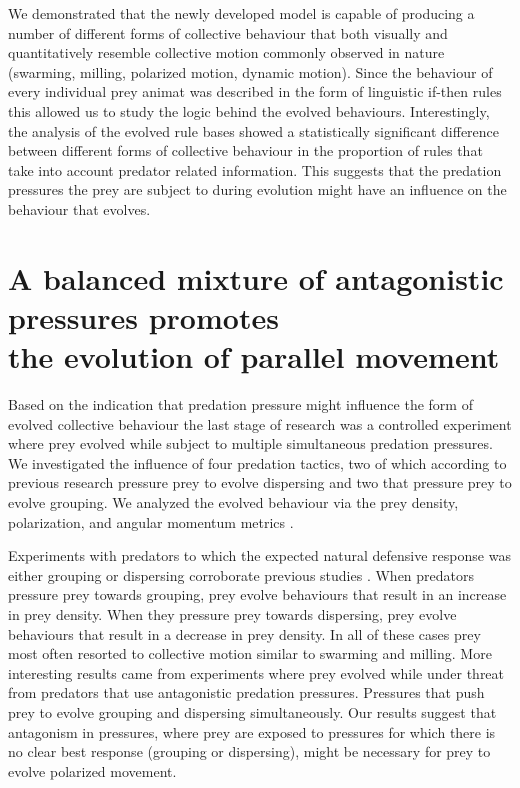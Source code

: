 We demonstrated that the newly developed model is capable of producing a number of different forms of collective behaviour that both visually and quantitatively \cite{couzin2002collective,vicsek2012collective,tunstrom2013collective} resemble collective motion commonly observed in nature (swarming, milling, polarized motion, dynamic motion). Since the behaviour of every individual prey animat was described in the form of linguistic if-then rules this allowed us to study the logic behind the evolved behaviours. Interestingly, the analysis of the evolved rule bases showed a statistically significant difference between different forms of collective behaviour in the proportion of rules that take into account predator related information. This suggests that the predation pressures the prey are subject to during evolution might have an influence on the behaviour that evolves.

\section{A balanced mixture of antagonistic pressures promotes\\ the evolution of parallel movement}

Based on the indication that predation pressure might influence the form of evolved collective behaviour the last stage of research was a controlled experiment where prey evolved while subject to multiple simultaneous predation pressures. We investigated the influence of four predation tactics, two of which according to previous research pressure prey to evolve dispersing and two that pressure prey to evolve grouping. We analyzed the evolved behaviour via the prey density, polarization, and angular momentum metrics \cite{couzin2002collective,olson2016evolution,tunstrom2013collective}.

Experiments with predators to which the expected natural defensive response was either grouping or dispersing corroborate previous studies \cite{biswas2014causes,olson2013predator,olson2016evolution,wood2007evolving}. When predators pressure prey towards grouping, prey evolve behaviours that result in an increase in prey density. When they pressure prey towards dispersing, prey evolve behaviours that result in a decrease in prey density. In all of these cases prey most often resorted to collective motion similar to swarming and milling. More interesting results came from experiments where prey evolved while under threat from predators that use antagonistic predation pressures. Pressures that push prey to evolve grouping and dispersing simultaneously. Our results suggest that antagonism in pressures, where prey are exposed to pressures for which there is no clear best response (grouping or dispersing), might be necessary for prey to evolve polarized movement.

